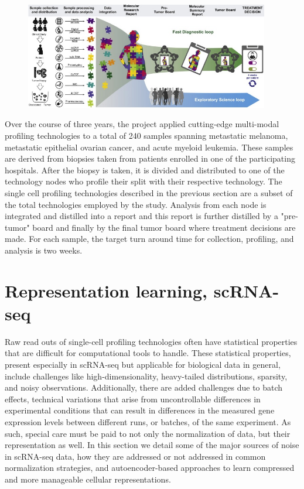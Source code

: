 \begin{figure}
  \begin{center}
    \includegraphics[width=0.95\textwidth]{figures/introduction/tupro.jpg}
  \end{center}
  \caption{}\label{fig:tupro-overview} %
\end{figure}

Over the course of three years, the project applied cutting-edge multi-modal profiling technologies to a total of 240 samples spanning metastatic melanoma, metastatic epithelial ovarian cancer, and acute myeloid leukemia.
These samples are derived from biopsies taken from patients enrolled in one of the participating hospitals.
After the biopsy is taken, it is divided and distributed to one of the technology nodes who profile their split with their respective technology.
The single cell profiling technologies described in the previous section are a subset of the total technologies employed by the study.
Analysis from each node is integrated and distilled into a report and 
this report is further distilled by a "pre-tumor" board and finally by the final tumor board where treatment decisions are made.
For each sample, the target turn around time for collection, profiling, and analysis is two weeks.

\section{Representation learning, scRNA-seq} \label{sec:scrna-seq}
Raw read outs of single-cell profiling technologies often have statistical properties that are difficult for computational tools to handle.
These statistical properties, present especially in scRNA-seq but applicable for biological data in general,
include challenges like high-dimensionality, heavy-tailed distributions, sparsity, and noisy observations.
Additionally, there are added challenges due to batch effects, 
technical variations that arise from uncontrollable differences in experimental conditions that can result in differences in the measured gene expression levels between different runs, or batches, of the same experiment.
As such, special care must be paid to not only the normalization of data, but their representation as well.
In this section we detail some of the major sources of noise in scRNA-seq data, how they are addressed or not addressed in common normalization strategies, and autoencoder-based approaches to learn compressed and more manageable cellular representations.

